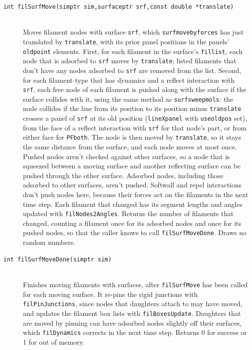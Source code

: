 \documentclass {scrbook}
\newcommand {\ttt} {\texttt}
\begin{document}
\begin{description}
\item[\ttt{int filSurfMove(simptr sim,surfaceptr srf,const double *translate)}] %
\hfill \\
Moves filament nodes with surface \ttt{srf}, which \ttt{surfmovebyforces} has just translated by \ttt{translate}, with its prior panel positions in the panels' \ttt{oldpoint} elements. First, for each filament in the surface's \ttt{fillist}, each node that is adsorbed to \ttt{srf} moves by \ttt{translate}; listed filaments that don't have any nodes adsorbed to \ttt{srf} are removed from the list. Second, for each filament type that has dynamics and a reflect interaction with \ttt{srf}, each free node of each filament is pushed along with the surface if the surface collides with it, using the same method as \ttt{surfsweepmols}: the node collides if the line from its position to its position minus \ttt{translate} crosses a panel of \ttt{srf} at its old position (\ttt{lineXpanel} with \ttt{useoldpos} set), from the face of a reflect interaction with \ttt{srf} for that node's part, or from either face for \ttt{PFboth}. The node is then moved by \ttt{translate}, so it stays the same distance from the surface, and each node moves at most once. Pushed nodes aren't checked against other surfaces, so a node that is squeezed between a moving surface and another reflecting surface can be pushed through the other surface. Adsorbed nodes, including those adsorbed to other surfaces, aren't pushed. Softwall and repel interactions don't push nodes here, because their forces act on the filaments in the next time step. Each filament that changed has its segment lengths and angles updated with \ttt{filNodes2Angles}. Returns the number of filaments that changed, counting a filament once for its adsorbed nodes and once for its pushed nodes, so that the caller knows to call \ttt{filSurfMoveDone}. Draws no random numbers.

\item[\ttt{int filSurfMoveDone(simptr sim)}] %
\hfill \\
Finishes moving filaments with surfaces, after \ttt{filSurfMove} has been called for each moving surface. It re-pins the rigid junctions with \ttt{filPinJunctions}, since nodes that daughters attach to may have moved, and updates the filament box lists with \ttt{filBoxesUpdate}. Daughters that are moved by pinning can have adsorbed nodes slightly off their surfaces, which \ttt{filDynamics} corrects in the next time step. Returns 0 for success or 1 for out of memory.


\end{description}
\end{document}
